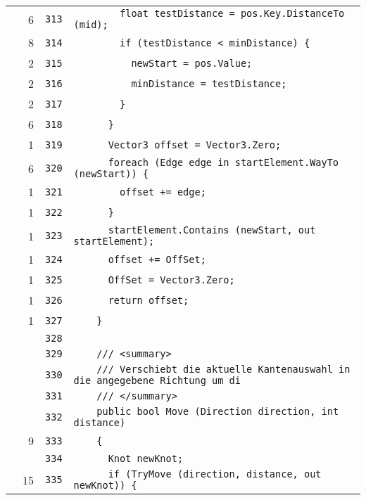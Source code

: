 \documentclass[a4paper,10pt]{article}
\begin{document}
\begin{longtable}[l]{lrrl}
\cellcolor{green} & 6 & \verb~313~ & \verb~        float testDistance = pos.Key.DistanceTo (mid);~\\
\cellcolor{green} & 8 & \verb~314~ & \verb~        if (testDistance < minDistance) {~\\
\cellcolor{green} & 2 & \verb~315~ & \verb~          newStart = pos.Value;~\\
\cellcolor{green} & 2 & \verb~316~ & \verb~          minDistance = testDistance;~\\
\cellcolor{green} & 2 & \verb~317~ & \verb~        }~\\
\cellcolor{green} & 6 & \verb~318~ & \verb~      }~\\
\cellcolor{green} & 1 & \verb~319~ & \verb~      Vector3 offset = Vector3.Zero;~\\
\cellcolor{green} & 6 & \verb~320~ & \verb~      foreach (Edge edge in startElement.WayTo (newStart)) {~\\
\cellcolor{green} & 1 & \verb~321~ & \verb~        offset += edge;~\\
\cellcolor{green} & 1 & \verb~322~ & \verb~      }~\\
\cellcolor{green} & 1 & \verb~323~ & \verb~      startElement.Contains (newStart, out startElement);~\\
\cellcolor{green} & 1 & \verb~324~ & \verb~      offset += OffSet;~\\
\cellcolor{green} & 1 & \verb~325~ & \verb~      OffSet = Vector3.Zero;~\\
\cellcolor{green} & 1 & \verb~326~ & \verb~      return offset;~\\
\cellcolor{green} & 1 & \verb~327~ & \verb~    }~\\
\cellcolor{gray} &  & \verb~328~ & \verb~~\\
\cellcolor{gray} &  & \verb~329~ & \verb~    /// <summary>~\\
\cellcolor{gray} &  & \verb~330~ & \verb~    /// Verschiebt die aktuelle Kantenauswahl in die angegebene Richtung um di~\\
\cellcolor{gray} &  & \verb~331~ & \verb~    /// </summary>~\\
\cellcolor{gray} &  & \verb~332~ & \verb~    public bool Move (Direction direction, int distance)~\\
\cellcolor{green} & 9 & \verb~333~ & \verb~    {~\\
\cellcolor{gray} &  & \verb~334~ & \verb~      Knot newKnot;~\\
\cellcolor{green} & 15 & \verb~335~ & \verb~      if (TryMove (direction, distance, out newKnot)) {~\\

\end{longtable}
\end{document}
